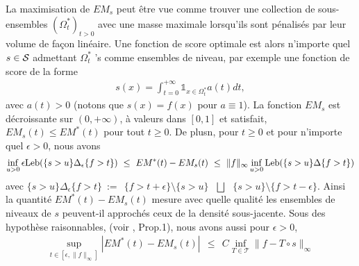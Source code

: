 %
\begin{center}
\label{resume_fr:EMcurve}
\end{center}
%
\noindent
La maximisation de $ EM_s $ peut être vue comme trouver une collection de sous-ensembles $ (\Omega ^ * _ t) _ {t> 0} $ avec une masse maximale lorsqu'ils sont pénalisés par leur volume de façon linéaire. Une fonction de score optimale est alors n'importe quel $ s \in \S $ admettant $ \Omega^*_t $ 's comme ensembles de niveau, par exemple une fonction de score de la forme
\begin{align*}
s(x)=\int_{t=0}^{+\infty} \mathds{1}_{x\in \Omega^*_t}a(t)dt,\end{align*}
avec $a(t)>0$ (notons que $s(x)=f(x)$ pour $a \equiv 1$).
%
La fonction $EM_s$ est décroissante sur $(0,+\infty)$, à valeurs dans $[0,1]$ et satisfait, $EM_s(t) \le EM^*(t)$ pour tout $t\geq 0$. 
De plusn, pour $t \ge 0$ et pour n'importe quel $\epsilon > 0$, nous avons 
\begin{align*}
\inf_{u>0} \epsilon \leb (\{ s >u\}\Delta_\epsilon \{f>t\}) ~\le~ EM^*(t)-EM_s(t) ~\le~ \|f\|_\infty \inf_{u>0} \leb (\{ s >u\}\Delta\{f>t\})
\end{align*}
avec $\{ s >u\}\Delta_\epsilon \{f>t\} ~:=~~ \{f>t+\epsilon\} \setminus \{ s >u\} ~~~\bigsqcup~~~ \{ s >u\} \setminus \{f>t-\epsilon\}$. Ainsi la quantité $EM^*(t)-EM_s(t)$ mesure avec quelle qualité les ensembles de niveaux de $s$ peuvent-il approchés ceux de la densité sous-jacente.
Sous des hypothèse raisonnables, (voir \cite{AISTAT15}, Prop.1), nous avons aussi pour $\epsilon >0$, 
\begin{align*}
\sup_{t\in[\epsilon ,\|f\|_\infty]}|EM^*(t)-EM_s(t)| ~~\le~~  C \inf_{T  \in \mathcal{T}} \|f-T\circ s\|_\infty
\end{align*}

